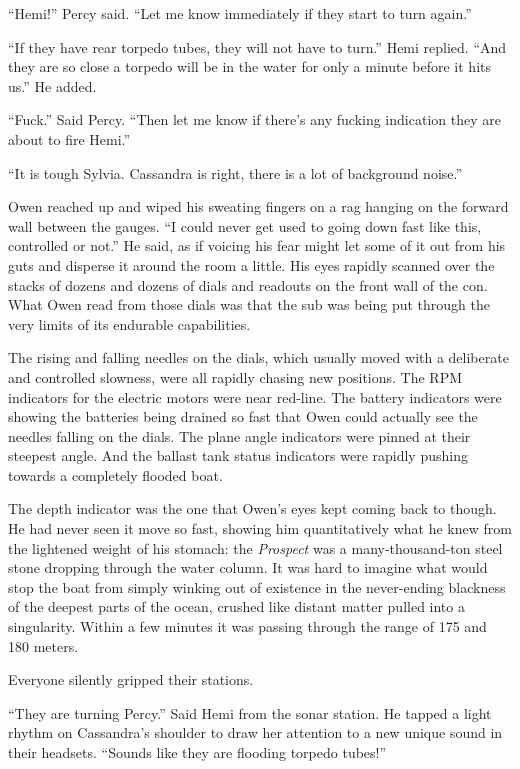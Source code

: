 \documentclass[]{scrbook}
\begin{document}
``Hemi!'' Percy said. ``Let me know immediately if they start to turn
again.''

``If they have rear torpedo tubes, they will not have to turn.'' Hemi
replied. ``And they are so close a torpedo will be in the water for only
a minute before it hits us.'' He added.

``Fuck.'' Said Percy. ``Then let me know if there's any fucking
indication they are about to fire Hemi.''

``It is tough Sylvia. Cassandra is right, there is a lot of background
noise.''

Owen reached up and wiped his sweating fingers on a rag hanging on the
forward wall between the gauges. ``I could never get used to going down
fast like this, controlled or not.'' He said, as if voicing his fear
might let some of it out from his guts and disperse it around the room a
little. His eyes rapidly scanned over the stacks of dozens and dozens of
dials and readouts on the front wall of the con. What Owen read from
those dials was that the sub was being put through the very limits of
its endurable capabilities.

The rising and falling needles on the dials, which usually moved with a
deliberate and controlled slowness, were all rapidly chasing new
positions. The RPM indicators for the electric motors were near
red-line. The battery indicators were showing the batteries being
drained so fast that Owen could actually see the needles falling on the
dials. The plane angle indicators were pinned at their steepest angle.
And the ballast tank status indicators were rapidly pushing towards a
completely flooded boat.

The depth indicator was the one that Owen's eyes kept coming back to
though. He had never seen it move so fast, showing him quantitatively
what he knew from the lightened weight of his stomach: the
\emph{Prospect} was a many-thousand-ton steel stone dropping through the
water column. It was hard to imagine what would stop the boat from
simply winking out of existence in the never-ending blackness of the
deepest parts of the ocean, crushed like distant matter pulled into a
singularity. Within a few minutes it was passing through the range of
175 and 180 meters.

Everyone silently gripped their stations.

``They are turning Percy.'' Said Hemi from the sonar station. He tapped
a light rhythm on Cassandra's shoulder to draw her attention to a new
unique sound in their headsets. ``Sounds like they are flooding torpedo
tubes!''
\end{document}
